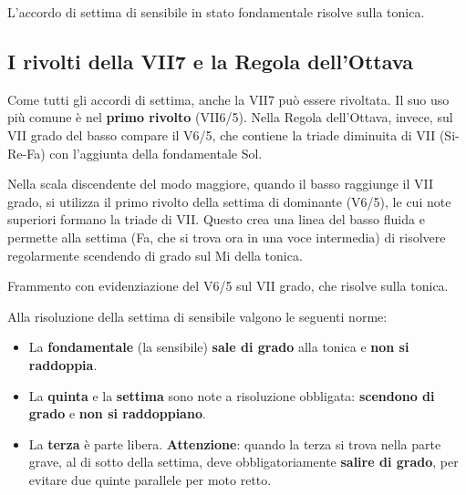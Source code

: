 \begin{esempio}
	\label{ex:vii7_maggiore}
	L'accordo di settima di sensibile in stato fondamentale risolve sulla tonica.
\end{esempio}

\subsection{I rivolti della VII7 e la Regola dell'Ottava}
\label{subsec:rivolti_vii7}

Come tutti gli accordi di settima, anche la VII7 può essere rivoltata. Il suo uso più comune è nel \textbf{primo rivolto} (VII6/5). Nella Regola dell'Ottava, invece, sul VII grado del basso compare il V6/5, che contiene la triade diminuita di VII (Si-Re-Fa) con l'aggiunta della fondamentale Sol.

\begin{regola}
	\label{reg:vii65_regola}
	Nella scala discendente del modo maggiore, quando il basso raggiunge il VII grado, si utilizza il primo rivolto della settima di dominante (V6/5), le cui note superiori formano la triade di VII. Questo crea una linea del basso fluida e permette alla settima (Fa, che si trova ora in una voce intermedia) di risolvere regolarmente scendendo di grado sul Mi della tonica.
\end{regola}

\begin{esempio}
	\label{ex:vii65_regola_maggiore}
	Frammento con evidenziazione del V6/5 sul VII grado, che risolve sulla tonica.
\end{esempio}

\begin{regola}
	\label{reg:comportamento_vii7}
	Alla risoluzione della settima di sensibile valgono le seguenti norme:
	\begin{itemize}
		\item La \textbf{fondamentale} (la sensibile) \textbf{sale di grado} alla tonica e \textbf{non si raddoppia}.
		\item La \textbf{quinta} e la \textbf{settima} sono note a risoluzione obbligata: \textbf{scendono di grado} e \textbf{non si raddoppiano}.
		\item La \textbf{terza} è parte libera. \textbf{Attenzione}: quando la terza si trova nella parte grave, al di sotto della settima, deve obbligatoriamente \textbf{salire di grado}, per evitare due quinte parallele per moto retto.
	\end{itemize}
\end{regola}

